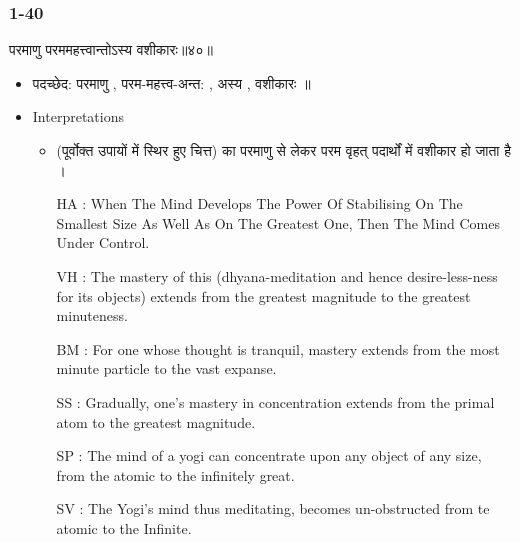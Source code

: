 \begin{frame}[fragile]\frametitle{1-40}
\begin{sanskrit}
परमाणु परममहत्त्वान्तोऽस्य वशीकारः॥४०॥
\end{sanskrit}

	\begin{itemize}
	\item पदच्छेद: परमाणु , परम-महत्त्व-अन्त: , अस्य , वशीकारः ॥
	\item Interpretations
		\begin{itemize}	
		\item (पूर्वोक्त उपायों में स्थिर हुए चित्त) का परमाणु से लेकर परम वृहत् पदार्थों में वशीकार हो जाता है ।
		\item [HA]: When The Mind Develops The Power Of Stabilising On The Smallest Size As Well As On The Greatest One, Then The Mind Comes Under Control.
		\item [VH]: The mastery of this (dhyana-meditation and hence desire-less-ness for its objects) extends from the greatest magnitude to the greatest minuteness.
		\item [BM]: For one whose thought is tranquil, mastery extends from the most minute particle to the vast expanse.
		\item [SS]: Gradually, one’s mastery in concentration extends from the primal atom to the greatest magnitude.
		\item [SP]: The mind of a yogi can concentrate upon any object of any size, from the atomic to the infinitely great.
		\item [SV]: The Yogi’s mind thus meditating, becomes un-obstructed from te atomic to the Infinite. 
		\end{itemize}
	\end{itemize}
	
\end{frame}

